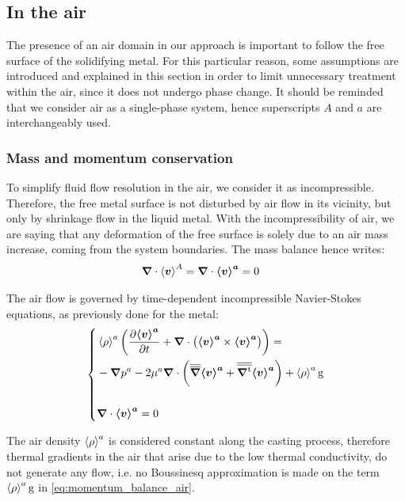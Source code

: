 \subsection{In the air}

The presence of an air domain in our approach is important to follow the free surface of the solidifying metal.
For this particular reason, some assumptions are introduced and explained in this section in order to limit unnecessary treatment within
the air, since it does not undergo phase change. It should be reminded that we consider air as a single-phase system, hence superscripts $A$ and $a$
are interchangeably used. 
 
\subsubsection{Mass and momentum conservation}

To simplify fluid flow resolution in the air, we consider it as incompressible.
Therefore, the free metal surface is not 
disturbed by air flow in its vicinity, but only by shrinkage flow in the liquid metal. With the incompressibility of air, we are saying that any deformation of the free surface 
is solely due to an air mass increase, coming from the system boundaries. The mass balance hence writes:
\begin{align}
\label{eq:mass_balance_air}
& \boldsymbol{\nabla} \cdot \left \langle \boldsymbol{v} \right \rangle^A = \boldsymbol{\nabla} \cdot \boldsymbol{\left \langle v \right \rangle^a} = 0
\end{align}

The air flow is governed by time-dependent incompressible Navier-Stokes equations, as previously done for the metal:
\begin{equation}
\label{eq:momentum_balance_air}
   \left\{
   \begin{aligned}
      & \left \langle \rho \right \rangle^a \left( \frac{\partial  \boldsymbol{\left \langle v \right \rangle^a} }{\partial t}  + \boldsymbol{\nabla} \cdot \left( \boldsymbol{\left \langle v \right \rangle^a} \times \boldsymbol{\left \langle v \right \rangle^a} \right) \right) = \\
	  &- \boldsymbol{\nabla} {p^a} - 2 \mu^a \boldsymbol{\nabla} \cdot \left( {\overline{\overline{\boldsymbol{\nabla}}}} \boldsymbol{\left \langle v \right \rangle^a} + {\overline{\overline{\boldsymbol{\nabla^\text{t}}}}} \boldsymbol{\left \langle v \right \rangle^a} \right)
	   + \left \langle \rho \right \rangle^a \boldsymbol{\text{g}}\\ \\
      & \boldsymbol{\nabla} \cdot \boldsymbol{\left \langle v \right \rangle^a} = 0
    \end{aligned}
    \right.
\end{equation}

The air density $\left \langle \rho \right \rangle^a$ is considered constant along the casting process, 
therefore thermal gradients in the air that arise due to the low
thermal conductivity, do not generate any flow, i.e. no Boussinesq approximation 
is made on the term $\left \langle \rho \right \rangle^a \boldsymbol{\text{g}}$ in \cref{eq:momentum_balance_air}.

